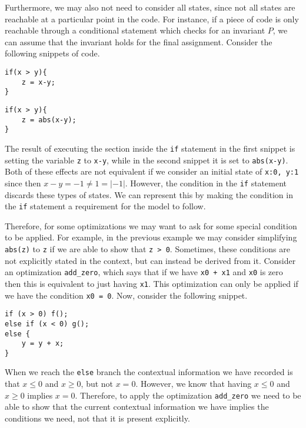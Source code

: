 Furthermore, we may also not need to consider all states, since not all states are reachable at a 
particular point in the code. For instance, if a piece of code is only reachable through a
conditional statement which checks for an invariant $P$, we can assume that the invariant holds for the 
final assignment. Consider the following snippets of code.

\begin{verbatim}
if(x > y){
    z = x-y;
}
\end{verbatim}
\begin{verbatim}
if(x > y){
    z = abs(x-y);
}
\end{verbatim}

The result of executing the section inside the \texttt{if} statement in the first snippet is 
setting the variable \texttt{z} to \texttt{x-y}, while in the second snippet it is
set to \texttt{abs(x-y)}. Both of these effects are not equivalent if we consider an initial
state of \texttt{{x:0, y:1}} since then ${x-y} = -1 \ne 1 = \lvert-1\rvert$. However,
the condition in the \texttt{if} statement discards these types of states. We can represent
this by making the condition in the \texttt{if} statement a requirement for the model to 
follow.

Therefore, for some optimizations we may want to ask for some special condition to be applied.
For example, in the previous example we may consider simplifying \texttt{abs(z)} to
\texttt{z} if we are able to show that \texttt{z > 0}. Sometimes, these conditions
are not explicitly stated in the context, but can instead be derived from it. Consider an optimization
\texttt{add_zero}, which says that if we have \texttt{x0 + x1} and 
\texttt{x0} is zero then this is equivalent to just having \texttt{x1}. This 
optimization can only be applied if we have the condition \texttt{x0 = 0}. Now, consider the
following snippet.

\begin{verbatim}
if (x > 0) f();
else if (x < 0) g();
else {
    y = y + x;
}
\end{verbatim}

When we reach the \texttt{else} branch the contextual information we have recorded is that 
$x \le 0$ and $x \ge 0$, but not $x = 0$. However, we know that having $x \le 0$ and $x \ge 0$ implies 
$x = 0$. Therefore, to apply the optimization \texttt{add_zero} we need to be able to show 
that the current contextual information we have implies the conditions we need, not that it is present
explicitly.

